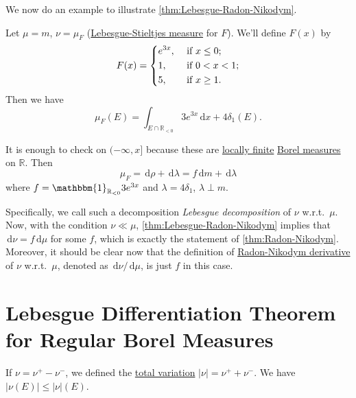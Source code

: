 We now do an example to illustrate \autoref{thm:Lebesgue-Radon-Nikodym}.

\begin{eg}
	Let \(\mu = m\), \(\nu = \mu_F\) (\hyperref[def:Lebesgue-Stieltjes-measure]{Lebesgue-Stieltjes measure} for \(F\)). We'll define \(F(x)\) by
	\[
		F(x) = \begin{dcases}
			e^{3x}, & \text{ if } x\leq 0 ;   \\
			1,      & \text{ if } 0 < x < 1 ; \\
			5,      & \text{ if } x \geq 1 .
		\end{dcases}
	\]
	Then we have
	\[
		\mu_F(E) = \int_{E \cap \mathbb{R}_{< 0}} 3e^{3x} \,\mathrm{d}x + 4 \delta_1(E).
	\]
\end{eg}
\begin{explanation}
	It is enough to check on \((-\infty,x]\) because these are \hyperref[def:locally-finite]{locally finite} \hyperref[def:Borel-measure]{Borel measures} on \(\mathbb{R}\). Then
	\[
		\mu_F = \,\mathrm{d}\rho + \,\mathrm{d}\lambda = f\,\mathrm{d}m + \,\mathrm{d}\lambda
	\]
	where \(f = \mathbbm{1}_{\mathbb{R}_{< 0}}3e^{3x}\) and \(\lambda = 4\delta_1\), \(\lambda \perp m\).
\end{explanation}

Specifically, we call such a decomposition \emph{Lebesgue decomposition} of \(\nu \) w.r.t.\ \(\mu \). Now, with the condition \(\nu \ll \mu \), \autoref{thm:Lebesgue-Radon-Nikodym} implies that \(\,\mathrm{d} \nu = f \,\mathrm{d} \mu \) for some \(f\), which is exactly the statement of \autoref{thm:Radon-Nikodym}. Moreover, it should be clear now that the definition of \hyperref[def:Radon-Nikodym-derivative]{Radon-Nikodym derivative} of \(\nu \) w.r.t.\ \(\mu \), denoted as \(\,\mathrm{d} \nu / \,\mathrm{d} \mu \), is just \(f\) in this case.

\section{Lebesgue Differentiation Theorem for Regular Borel Measures}

\begin{prev}
	If \(\nu = \nu^+ - \nu^-\), we defined the \hyperref[def:total-variation]{total variation} \(\vert \nu \vert = \nu^+ + \nu^-\). We have \(\vert \nu(E) \vert \leq \vert \nu \vert(E)\).
\end{prev}

